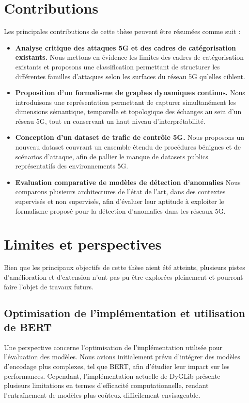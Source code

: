 \documentclass[a4paper,11pt,twoside]{StyleThese}
\begin{document}
\section{Contributions}

Les principales contributions de cette thèse peuvent être résumées comme suit :

\begin{itemize}
\item \textbf{Analyse critique des attaques 5G et des cadres de catégorisation existants.} Nous mettons en évidence les limites des cadres de catégorisation existants et proposons une classification permettant de structurer les différentes familles d'attaques selon les surfaces du réseau 5G qu'elles ciblent.
\item \textbf{Proposition d'un formalisme de graphes dynamiques continus.} Nous introduisons une représentation permettant de capturer simultanément les dimensions sémantique, temporelle et topologique des échanges au sein d'un réseau 5G, tout en conservant un haut niveau d'interprétabilité.
\item \textbf{Conception d'un dataset de trafic de contrôle 5G.} Nous proposons un nouveau dataset couvrant un ensemble étendu de procédures bénignes et de scénarios d'attaque, afin de pallier le manque de datasets publics représentatifs des environnements 5G.
\item \textbf{Evaluation comparative de modèles de détection d'anomalies} Nous comparons plusieurs architectures de l'état de l'art, dans des contextes supervisés et non supervisés, afin d'évaluer leur aptitude à exploiter le formalisme proposé pour la détection d'anomalies dans les réseaux 5G.
\end{itemize}

\newpage

\section{Limites et perspectives}
Bien que les principaux objectifs de cette thèse aient été atteints, plusieurs pistes d'amélioration et d'extension n'ont pas pu être explorées pleinement et pourront faire l'objet de travaux futurs.

\subsection{Optimisation de l'implémentation et utilisation de BERT}
Une perspective concerne l'optimisation de l'implémentation utilisée pour l'évaluation des modèles. Nous avions initialement prévu d'intégrer des modèles d'encodage plus complexes, tel que BERT, afin d'étudier leur impact sur les performances. Cependant, l'implémentation actuelle de DyGLib présente plusieurs limitations en termes d'efficacité computationnelle, rendant l'entraînement de modèles plus coûteux difficilement envisageable.
\end{document}
